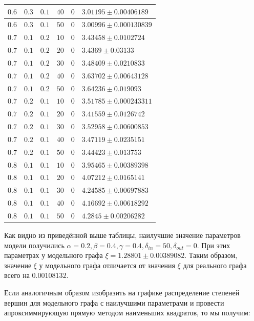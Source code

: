 \documentclass[14pt]{extreport}
\begin{document}
\begin{center}
\begin{longtable}{|p{1cm}|p{1cm}|p{1cm}|p{1cm}|p{1cm}|p{8cm}|}
$0.6$ & $0.3$ & $0.1$ & $40$ & $0$ & $3.01195 \pm 0.00406189$ \\ \hline
$0.6$ & $0.3$ & $0.1$ & $50$ & $0$ & $3.00996 \pm 0.000130839$ \\ \hline
$0.7$ & $0.1$ & $0.2$ & $10$ & $0$ & $3.43458 \pm 0.0102724$ \\ \hline
$0.7$ & $0.1$ & $0.2$ & $20$ & $0$ & $3.4369 \pm 0.03133$ \\ \hline
$0.7$ & $0.1$ & $0.2$ & $30$ & $0$ & $3.48409 \pm 0.0210833$ \\ \hline
$0.7$ & $0.1$ & $0.2$ & $40$ & $0$ & $3.63702 \pm 0.00643128$ \\ \hline
$0.7$ & $0.1$ & $0.2$ & $50$ & $0$ & $3.64236 \pm 0.019093$ \\ \hline
$0.7$ & $0.2$ & $0.1$ & $10$ & $0$ & $3.51785 \pm 0.000243311$ \\ \hline
$0.7$ & $0.2$ & $0.1$ & $20$ & $0$ & $3.41559 \pm 0.0126742$ \\ \hline
$0.7$ & $0.2$ & $0.1$ & $30$ & $0$ & $3.52958 \pm 0.00600853$ \\ \hline
$0.7$ & $0.2$ & $0.1$ & $40$ & $0$ & $3.47119 \pm 0.0235151$ \\ \hline
$0.7$ & $0.2$ & $0.1$ & $50$ & $0$ & $3.44423 \pm 0.013753$ \\ \hline
$0.8$ & $0.1$ & $0.1$ & $10$ & $0$ & $3.95465 \pm 0.00389398$ \\ \hline
$0.8$ & $0.1$ & $0.1$ & $20$ & $0$ & $4.07212 \pm 0.0165141$ \\ \hline
$0.8$ & $0.1$ & $0.1$ & $30$ & $0$ & $4.24585 \pm 0.00697883$ \\ \hline
$0.8$ & $0.1$ & $0.1$ & $40$ & $0$ & $4.16692 \pm 0.00618292$ \\ \hline
$0.8$ & $0.1$ & $0.1$ & $50$ & $0$ & $4.2845 \pm 0.00206282$ \\ \hline
\end{longtable}
\end{center}

Как видно из приведённой выше таблицы, наилучшие значение параметров модели получились $\alpha = 0.2, \beta = 0.4, \gamma = 0.4, \delta_{in} = 50, \delta_{out} = 0$. При этих параметрах у модельного графа $\xi = 1.28801 \pm 0.00389082$. Таким образом, значение $\xi$ у модельного графа отличается от значения $\xi$ для реального графа всего на $0.00108132$.

Если аналогичным образом изобразить на графике распределение степеней вершин для модельного графа с наилучшими параметрами и провести апроксиммирующую прямую методом наименьших квадратов, то мы получим:
\end{document}
